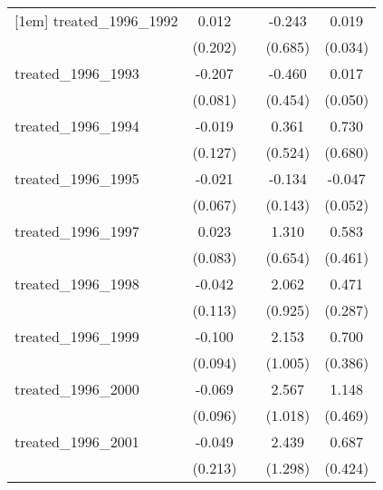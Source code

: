 {\begin{tabular}{l*{4}{c}}
[1em]
treated\_1996\_1992&       0.012         &                     &      -0.243         &       0.019         \\
            &     (0.202)         &                     &     (0.685)         &     (0.034)         \\
[1em]
treated\_1996\_1993&      -0.207\sym{*}  &                     &      -0.460         &       0.017         \\
            &     (0.081)         &                     &     (0.454)         &     (0.050)         \\
[1em]
treated\_1996\_1994&      -0.019         &                     &       0.361         &       0.730         \\
            &     (0.127)         &                     &     (0.524)         &     (0.680)         \\
[1em]
treated\_1996\_1995&      -0.021         &                     &      -0.134         &      -0.047         \\
            &     (0.067)         &                     &     (0.143)         &     (0.052)         \\
[1em]
treated\_1996\_1997&       0.023         &                     &       1.310\sym{*}  &       0.583         \\
            &     (0.083)         &                     &     (0.654)         &     (0.461)         \\
[1em]
treated\_1996\_1998&      -0.042         &                     &       2.062\sym{*}  &       0.471         \\
            &     (0.113)         &                     &     (0.925)         &     (0.287)         \\
[1em]
treated\_1996\_1999&      -0.100         &                     &       2.153\sym{*}  &       0.700         \\
            &     (0.094)         &                     &     (1.005)         &     (0.386)         \\
[1em]
treated\_1996\_2000&      -0.069         &                     &       2.567\sym{*}  &       1.148\sym{*}  \\
            &     (0.096)         &                     &     (1.018)         &     (0.469)         \\
[1em]
treated\_1996\_2001&      -0.049         &                     &       2.439         &       0.687         \\
            &     (0.213)         &                     &     (1.298)         &     (0.424)         \\

\end{tabular}}
